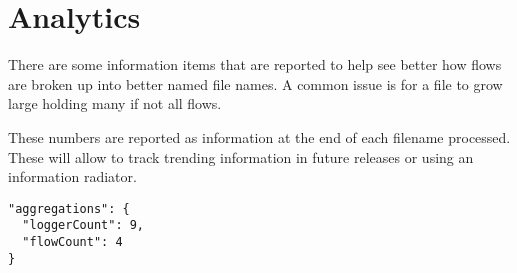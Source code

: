 \documentclass[a4paper,12pt]{article} %
\begin{document}
\section{Analytics}

There are some information items that are reported to help see better how flows are broken up into better named file names. A common issue is for a file to grow large holding many if not all flows.

These numbers are reported as information at the end of each filename processed. These will allow to track trending information in future releases or using an information radiator.

\begin{Verbatim}[fontsize=\small]
"aggregations": {
  "loggerCount": 9,
  "flowCount": 4
}
\end{Verbatim}
\end{document}
